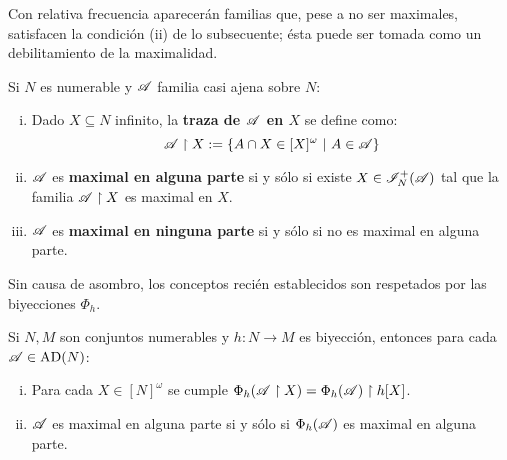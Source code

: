  Con relativa frecuencia aparecerán familias que, pese a no ser maximales, satisfacen la condición (ii) de lo subsecuente; ésta puede ser tomada como un debilitamiento de la maximalidad.

 \begin{definicion}\label{def-MaxEnAlguna}
  Si $N$ es numerable y $\mathscr{A}$ familia casi ajena sobre $N$:
  \begin{enumerate}[i)]
   \item Dado $X \subseteq N$ infinito, la \textbf{traza de $\mathscr{A}$ en $X$} se define como:
   $$ \mathscr{A} \upharpoonright X := \{ A \cap X \in [X]^\omega \text{ $|$ } A \in \mathscr{A} \} $$
   \item $\mathscr{A}$ es \textbf{maximal en alguna parte} si y sólo si existe $X \in \mathscr{I}_N^+(\mathscr{A})$ tal que la familia $\mathscr{A} \upharpoonright X$ es maximal en $X$.
   \item $\mathscr{A}$ es \textbf{maximal en ninguna parte} si y sólo si no es maximal en alguna parte.
  \end{enumerate}
 \end{definicion}

 Sin causa de asombro, los conceptos recién establecidos son respetados por las biyecciones $\Phi_h$.

 \begin{proposicion}
  Si $N,M$ son conjuntos numerables y $h:N \to M$ es biyección, entonces para cada $\mathscr{A} \in \operatorname{AD}(N)$:
  \begin{enumerate}[i)]
   \item Para cada $X \in [N]^\omega$ se cumple $\Phi_h(\mathscr{A} \upharpoonright X)=\Phi_h(\mathscr{A}) \upharpoonright h[X]$.
   \item $\mathscr{A}$ es maximal en alguna parte si y sólo si $\Phi_h(\mathscr{A})$ es maximal en alguna parte.
  \end{enumerate}
 \end{proposicion}

